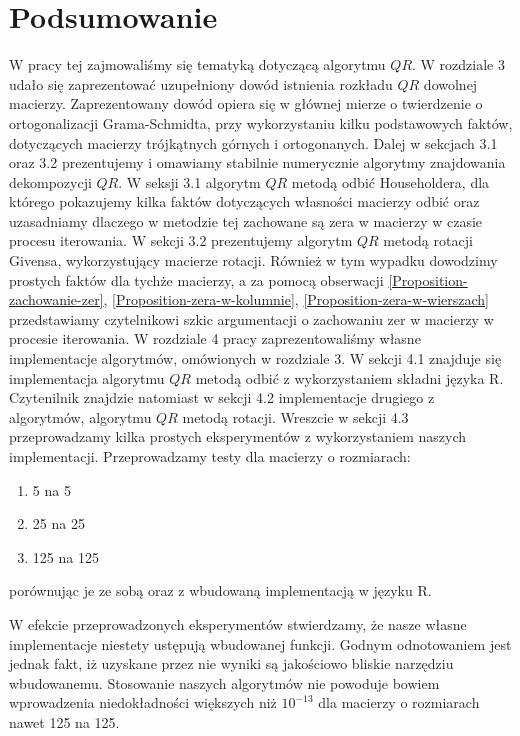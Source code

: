 \documentclass[12pt,a4paper]{report}
\newcommand{\mx}[1]{{#1}}
\begin{document}
\chapter{Podsumowanie}

W pracy tej zajmowaliśmy się tematyką dotyczącą algorytmu $\mx{QR}$. W rozdziale 3 udało się zaprezentować uzupełniony dowód istnienia rozkładu $\mx{QR}$ dowolnej macierzy. Zaprezentowany dowód opiera się w głównej mierze o twierdzenie o ortogonalizacji Grama-Schmidta, przy wykorzystaniu kilku podstawowych faktów, dotyczących macierzy trójkątnych górnych i ortogonanych. Dalej w sekcjach 3.1 oraz 3.2 prezentujemy i omawiamy stabilnie numerycznie algorytmy znajdowania dekompozycji $\mx{QR}$. W seksji 3.1 algorytm $\mx{QR}$ metodą odbić Householdera, dla którego pokazujemy kilka faktów dotyczących własności macierzy odbić oraz uzasadniamy dlaczego w metodzie tej zachowane są  zera w macierzy w czasie procesu iterowania. W sekcji 3.2 prezentujemy algorytm $\mx{QR}$ metodą rotacji Givensa, wykorzystujący macierze rotacji. Również w tym wypadku dowodzimy prostych faktów dla tychże macierzy, a za pomocą obserwacji \ref{Proposition-zachowanie-zer}, \ref{Proposition-zera-w-kolumnie}, \ref{Proposition-zera-w-wierszach}  przedstawiamy czytelnikowi szkic argumentacji o zachowaniu zer w macierzy w procesie iterowania. W rozdziale 4 pracy zaprezentowaliśmy własne implementacje algorytmów, omówionych w rozdziale 3. W sekcji 4.1 znajduje się implementacja algorytmu $\mx{QR}$ metodą odbić z wykorzystaniem składni języka R. Czytenilnik znajdzie natomiast w sekcji 4.2 implementacje drugiego z algorytmów, algorytmu $\mx{QR}$ metodą rotacji. Wreszcie w sekcji 4.3 przeprowadzamy kilka prostych eksperymentów z wykorzystaniem naszych implementacji. Przeprowadzamy testy dla macierzy o rozmiarach:
\begin{enumerate}
\item 5 na 5
\item 25 na 25
\item 125 na 125
\end{enumerate}

porównując je ze sobą oraz z wbudowaną implementacją w języku R.


W efekcie przeprowadzonych eksperymentów stwierdzamy, że nasze własne implementacje niestety ustępują wbudowanej funkcji. Godnym odnotowaniem jest jednak fakt, iż uzyskane przez nie wyniki są jakościowo bliskie narzędziu wbudowanemu. Stosowanie naszych algorytmów nie powoduje bowiem wprowadzenia niedokładności większych niż $10^{-13}$ dla macierzy o rozmiarach nawet 125 na 125.






\end{document}
